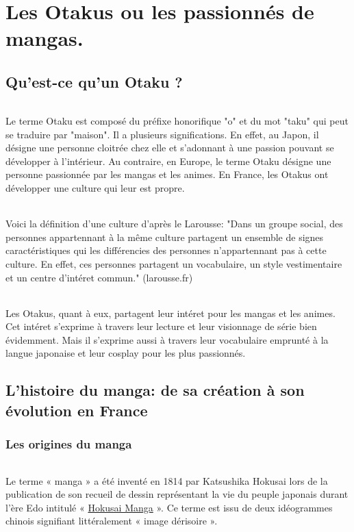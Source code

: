 \part{Les Otakus ou les passionnés de mangas.}
\chapter{Qu'est-ce qu'un Otaku ?}
\paragraph{}
Le terme Otaku est composé du préfixe honorifique "o" et du mot "taku" qui peut se traduire par "maison". Il a plusieurs significations. En effet, au Japon, il désigne une personne cloitrée chez elle et s'adonnant à une passion pouvant se développer à l'intérieur. Au contraire, en Europe, le terme Otaku désigne une personne passionnée par les mangas et les animes. En France, les Otakus ont développer une culture qui leur est propre.
\paragraph{}
Voici la définition d'une culture d'après le Larousse:
"Dans un groupe social, des personnes appartennant à la même culture partagent un ensemble de signes caractéristiques qui les différencies des personnes n'appartennant pas à cette culture. En effet, ces personnes partagent un vocabulaire, un style vestimentaire et un centre d'intéret commun." (larousse.fr)
\paragraph{}
Les Otakus, quant à eux, partagent leur intéret pour les mangas et les animes. Cet intéret s'exprime à travers leur lecture et leur visionnage de série bien évidemment. Mais il s'exprime aussi à travers leur vocabulaire emprunté à la langue japonaise et leur cosplay pour les plus passionnés. 

\chapter{L'histoire du manga: de sa création à son évolution en France}

\section{Les origines du manga}
\paragraph{}
Le terme « manga » a été inventé en 1814 par Katsushika Hokusai lors de la publication de son recueil de dessin représentant la vie du peuple japonais durant l’ère Edo intitulé « \underline{Hokusai Manga} ». Ce terme est issu de deux idéogrammes chinois signifiant littéralement « image dérisoire ». 
